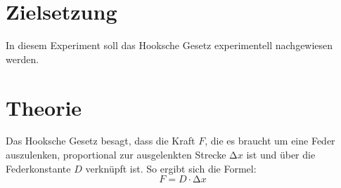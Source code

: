 


\section{Zielsetzung}
\label{sec:Theorie}
In diesem Experiment soll das Hooksche Gesetz experimentell nachgewiesen werden.

\section{Theorie}
Das Hooksche Gesetz besagt, dass die Kraft $F$, die es braucht um eine Feder auszulenken, proportional zur ausgelenkten Strecke $\increment x$ ist
und über die Federkonstante $D$ verknüpft ist.
So ergibt sich die Formel:
\begin{equation}
    F = D \cdot \increment x
    \label{eq:Hook}
\end{equation}


